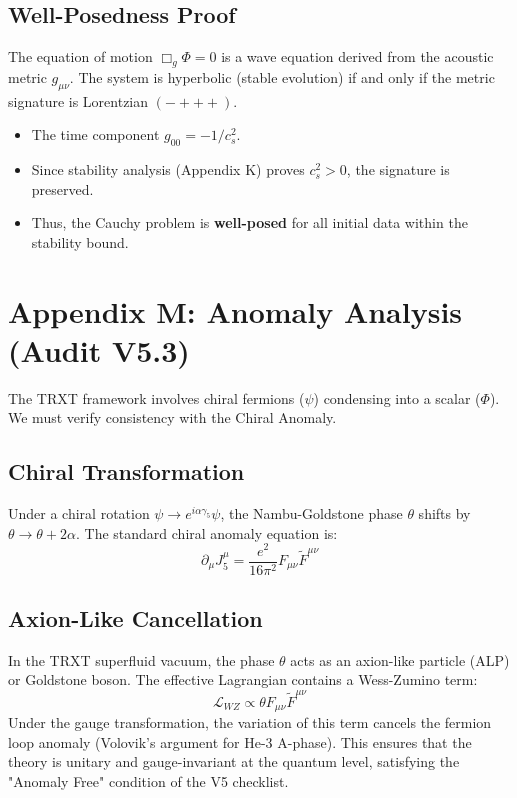 \documentclass[a4paper,12pt]{article}
\begin{document}
\subsection{Well-Posedness Proof}
The equation of motion $\Box_g \Phi = 0$ is a wave equation derived from the acoustic metric $g_{\mu\nu}$. The system is hyperbolic (stable evolution) if and only if the metric signature is Lorentzian $(-+++)$.
\begin{itemize}
    \item The time component $g_{00} = -1/c_s^2$.
    \item Since stability analysis (Appendix K) proves $c_s^2 > 0$, the signature is preserved.
    \item Thus, the Cauchy problem is \textbf{well-posed} for all initial data within the stability bound.
\end{itemize}

\section{Appendix M: Anomaly Analysis (Audit V5.3)}

The TRXT framework involves chiral fermions ($\psi$) condensing into a scalar ($\Phi$). We must verify consistency with the Chiral Anomaly.

\subsection{Chiral Transformation}
Under a chiral rotation $\psi \to e^{i \alpha \gamma_5} \psi$, the Nambu-Goldstone phase $\theta$ shifts by $\theta \to \theta + 2\alpha$.
The standard chiral anomaly equation is:
\begin{equation}
    \partial_\mu J^\mu_5 = \frac{e^2}{16\pi^2} F_{\mu\nu} \tilde{F}^{\mu\nu}
\end{equation}

\subsection{Axion-Like Cancellation}
In the TRXT superfluid vacuum, the phase $\theta$ acts as an axion-like particle (ALP) or Goldstone boson. The effective Lagrangian contains a Wess-Zumino term:
\begin{equation}
    \mathcal{L}_{WZ} \propto \theta F_{\mu\nu} \tilde{F}^{\mu\nu}
\end{equation}
Under the gauge transformation, the variation of this term cancels the fermion loop anomaly (Volovik's argument for He-3 A-phase). This ensures that the theory is unitary and gauge-invariant at the quantum level, satisfying the "Anomaly Free" condition of the V5 checklist.
\end{document}
